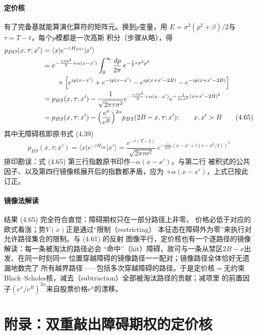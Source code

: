 \paragraph{定价核}
有了完备基就能算演化算符的矩阵元。换到$p$变量，用
$E=\sigma^{2}(p^{2}+\beta)/2$与$\tau=T-t$，每个$p$模都是一次高斯
积分（步骤从略），得
\begin{align*}
p_{DO}(x,\tau;x')&=\langle x\vert e^{-\tau H_{DO}}\vert x'\rangle\\
&=e^{-\frac{\tau\beta\sigma^{2}}{2}+\alpha(x-x')}\int_{0}^{\infty}
\frac{dp}{2\pi}\,e^{-\frac{1}{2}\tau\sigma^{2}p^{2}}\\
&\qquad\times\Bigl[e^{ip(x-x')}+e^{-ip(x-x')}-e^{ip(x+x'-2B)}
-e^{-ip(x+x'-2B)}\Bigr]\\
&=p_{BS}(x,\tau;x')-\frac{1}{\sqrt{2\pi\tau\sigma^{2}}}
e^{-\frac{\tau\beta\sigma^{2}}{2}+\alpha(x-x')}
e^{-\frac{1}{2\tau\sigma^{2}}(x+x'-2B)^{2}}\\
&=p_{BS}(x,\tau;x')-\Bigl(\frac{e^{x}}{e^{B}}\Bigr)^{2\alpha}
p_{BS}(2B-x,\tau;x');\qquad x,x'>B
\tag{4.65}
\end{align*}
其中无障碍核即原书式 (4.39)
\begin{equation*}
p_{BS}(x,\tau;x')=\langle x\vert e^{-\tau H_{BS}}\vert x'\rangle
=\frac{e^{-r(T-t)}}{\sqrt{2\pi\tau\sigma^{2}}}\,
e^{-\frac{1}{2\tau\sigma^{2}}\left(x-x'+\tau(r-\sigma^{2}/2)\right)^{2}}
\end{equation*}
排印勘误：式 (4.65) 第三行指数原书印作$-\alpha(x-x')$，与第二行
被积式的公共因子、以及第四行镜像核展开后的指数都矛盾，应为
$+\alpha(x-x')$，上式已按此订正。

\paragraph{镜像法解读}
结果 (4.65) 完全符合直觉：障碍期权只在一部分路径上非零，
价格必低于对应的欧式看涨；势$V(x)$正是通过“限制（restricting）
本征态在障碍外为零”来执行对允许路径集合的限制。与 (4.61) 的反射
图像平行，定价核也有一个逐路径的镜像解读：每一条被淘汰的路径必会
“命中”（hit）障碍，故可与一条从禁区$2B-x$出发、在同一时刻同一
位置穿越障碍的镜像路径一一配对；镜像路径全体恰好无遗漏地数完了
所有越界路径——包括多次穿越障碍的路径。于是定价核$=$无约束
Black--Scholes核，减去（subtraction）全部被淘汰路径的贡献；减项里
的前置因子$(e^{x}/e^{B})^{2\alpha}$来自股票价格$e^{x}$的漂移。

\section{附录：双重敲出障碍期权的定价核}


